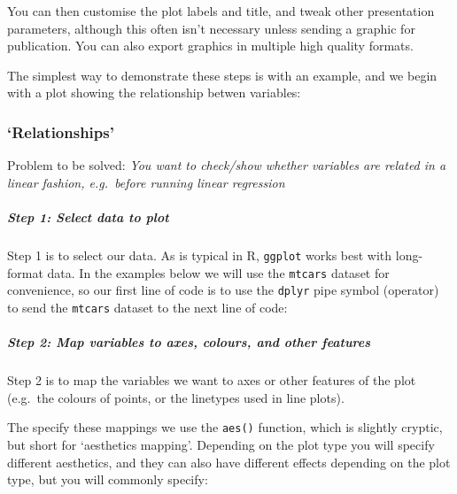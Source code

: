 \documentclass[]{article}
\newenvironment{Shaded}{\begin{snugshade}}{\end{snugshade}}
\newcommand{\NormalTok}[1]{#1}
\newcommand{\OperatorTok}[1]{\textcolor[rgb]{0.81,0.36,0.00}{\textbf{#1}}}
\newcommand{\StringTok}[1]{\textcolor[rgb]{0.31,0.60,0.02}{#1}}
\let\oldsubparagraph\subparagraph
\renewcommand{\subparagraph}[1]{\oldsubparagraph{#1}\mbox{}}
\begin{document}
You can then customise the plot labels and title, and tweak other presentation
parameters, although this often isn't necessary unless sending a graphic for
publication. You can also export graphics in multiple high quality formats.

The simplest way to demonstrate these steps is with an example, and we begin
with a plot showing the relationship betwen variables:

\hypertarget{relationships}{%
\subsubsection*{`Relationships'}\label{relationships}}

Problem to be solved: \emph{You want to check/show whether variables are related in a
linear fashion, e.g.~before running linear regression}

\hypertarget{step-1-select-data-to-plot}{%
\subparagraph{Step 1: Select data to plot}\label{step-1-select-data-to-plot}}

Step 1 is to select our data. As is typical in R, \texttt{ggplot} works best with
long-format data. In the examples below we will use the \texttt{mtcars} dataset for
convenience, so our first line of code is to use the \texttt{dplyr} pipe symbol
(operator) to send the \texttt{mtcars} dataset to the next line of code:

\begin{Shaded}
\end{Shaded}

\hypertarget{step-2-map-variables-to-axes-colours-and-other-features}{%
\subparagraph{Step 2: Map variables to axes, colours, and other features}\label{step-2-map-variables-to-axes-colours-and-other-features}}

Step 2 is to map the variables we want to axes or other features of the plot
(e.g.~the colours of points, or the linetypes used in line plots).

The specify these mappings we use the \texttt{aes()} function, which is slightly
cryptic, but short for `aesthetics mapping'. Depending on the plot type you will
specify different aesthetics, and they can also have different effects depending
on the plot type, but you will commonly specify:
\end{document}
